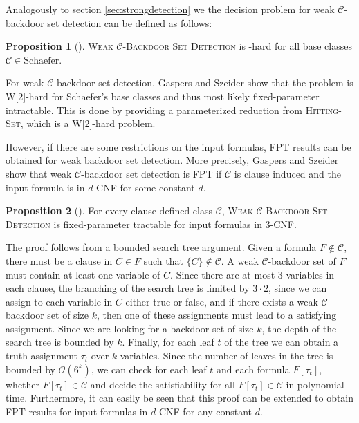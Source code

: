 \documentclass[11pt,a4paper]{article}
\makeatletter
\newcommand{\problemtitle}[1]{\gdef\@problemtitle{#1}}%
\newcommand{\probleminput}[1]{\gdef\@probleminput{#1}}%
\newcommand{\problemquestion}[1]{\gdef\@problemquestion{#1}}%
\newcommand{\problemparam}[1]{\gdef\@problemparam{#1}}%
\theoremstyle{definition}
\theoremstyle{proposition}
\newtheorem{proposition}{Proposition}[section]
\makeatother
\begin{document}
Analogously to section \ref{sec:strongdetection} we the decision problem for weak $\mathcal{C}$-backdoor set detection can be defined as follows:
\begin{csproblemparam}
    \problemtitle{Weak $\mathcal{C}$-Backdoor Set Detection}
    \probleminput{A CNF formula $F$ and an integer $k \geq 0$}
    \problemparam{The integer $k$}
    \problemquestion{Does $F$ have a weak $\mathcal{C}$-backdoor set of size at most $k$?}
\end{csproblemparam}
\begin{proposition}[{\cite[Proposition 1, p.293f]{Gaspers2012}}]
\textsc{Weak $\mathcal{C}$-Backdoor Set Detection} is -hard for all base classes $\mathcal{C}\in \text{Schaefer}$.
\end{proposition} 
For weak $\mathcal{C}$-backdoor set detection, Gaspers and Szeider show that the problem is W[2]-hard for Schaefer's base classes and thus most likely fixed-parameter intractable. This is done by providing a parameterized reduction from \textsc{Hitting-Set}, which is a W[2]-hard problem. 

However, if there are some restrictions on the input formulas, FPT results can be obtained for weak backdoor set detection. More precisely, Gaspers and Szeider show that weak $\mathcal{C}$-backdoor set detection is FPT if $\mathcal{C}$ is clause induced and the input formula is in $d$-CNF for some constant $d$. 
\begin{proposition}[{\cite[Proposition 2, p.294f]{Gaspers2012}}]
For every clause-defined class $\mathcal{C}$, \textsc{Weak $\mathcal{C}$-Backdoor Set Detection} is fixed-parameter tractable for input formulas in 3-CNF.
\end{proposition}
The proof follows from a bounded search tree argument. Given a formula $F \notin \mathcal{C}$, there must be a clause in $C \in F$ such that $\{C\} \notin \mathcal{C}$. A weak $\mathcal{C}$-backdoor set of $F$ must contain at least one variable of $C$. Since there are at most 3 variables in each clause, the branching of the search tree is limited by $3 \cdot 2$, since we can assign to each variable in $C$ either true or false, and if there exists a weak $\mathcal{C}$-backdoor set of size $k$, then one of these assignments must lead to a satisfying assignment. Since we are looking for a backdoor set of size $k$, the depth of the search tree is bounded by $k$. Finally, for each leaf $t$ of the tree we can obtain a truth assignment $\tau_t$ over $k$ variables. Since the number of leaves in the tree is bounded by $\mathcal{O}(6^k)$, we can check for each leaf $t$ and each formula $F[\tau_t]$, whether $F[\tau_t] \in \mathcal{C}$ and decide the satisfiability for all $F[\tau_t] \in \mathcal{C}$ in polynomial time. Furthermore, it can easily be seen that this proof can be extended to obtain FPT results for input formulas in $d$-CNF for any constant $d$.  
\end{document}
